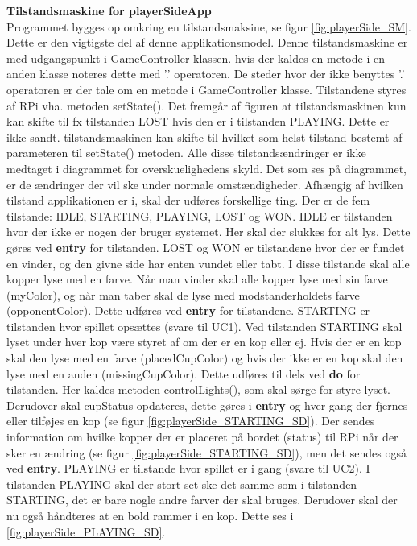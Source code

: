 \documentclass[Arkitektur/System_main.tex]{subfiles}
\begin{document}
{\large\textbf{Tilstandsmaskine for playerSideApp}}\\
Programmet bygges op omkring en tilstandsmaksine, se figur \ref{fig:playerSide_SM}. Dette er den vigtigste del af denne applikationsmodel. Denne tilstandsmaskine er med udgangspunkt i GameController klassen. hvis der kaldes en metode i en anden klasse noteres dette med '.' operatoren. De steder hvor der ikke benyttes '.' operatoren er der tale om en metode i GameController klasse. Tilstandene styres af RPi vha. metoden setState(). Det fremgår af figuren at tilstandsmaskinen kun kan skifte til fx tilstanden LOST hvis den er i tilstanden PLAYING. Dette er ikke sandt. tilstandsmaskinen kan skifte til hvilket som helst tilstand bestemt af parameteren til setState() metoden. Alle disse tilstandsændringer er ikke medtaget i diagrammet for overskuelighedens skyld. Det som ses på diagrammet, er de ændringer der vil ske under normale omstændigheder. Afhængig af hvilken tilstand applikationen er i, skal der udføres forskellige ting. Der er de fem tilstande: IDLE, STARTING, PLAYING, LOST og WON. IDLE er tilstanden hvor der ikke er nogen der bruger systemet. Her skal der slukkes for alt lys. Dette gøres ved \textbf{entry} for tilstanden. LOST og WON er tilstandene hvor der er fundet en vinder, og den givne side har enten vundet eller tabt. I disse tilstande skal alle kopper lyse med en farve. Når man vinder skal alle kopper lyse med sin farve (myColor), og når man taber skal de lyse med modstanderholdets farve (opponentColor). Dette udføres ved \textbf{entry} for tilstandene. STARTING er tilstanden hvor spillet opsættes (svare til UC1). Ved tilstanden STARTING skal lyset under hver kop være styret af om der er en kop eller ej. Hvis der er en kop skal den lyse med en farve (placedCupColor) og hvis der ikke er en kop skal den lyse med en anden (missingCupColor). Dette udføres til dels ved \textbf{do} for tilstanden. Her kaldes metoden controlLights(), som skal sørge for styre lyset. Derudover skal cupStatus opdateres, dette gøres i \textbf{entry} og hver gang der fjernes eller tilføjes en kop (se figur \ref{fig:playerSide_STARTING_SD}). Der sendes information om hvilke kopper der er placeret på bordet (status) til RPi når der sker en ændring (se figur \ref{fig:playerSide_STARTING_SD}), men det sendes også ved \textbf{entry}.
PLAYING er tilstande hvor spillet er i gang (svare til UC2). I tilstanden PLAYING skal der stort set ske det samme som i tilstanden STARTING, det er bare nogle andre farver der skal bruges. Derudover skal der nu også håndteres at en bold rammer i en kop. Dette ses i \ref{fig:playerSide_PLAYING_SD}.
\end{document}
